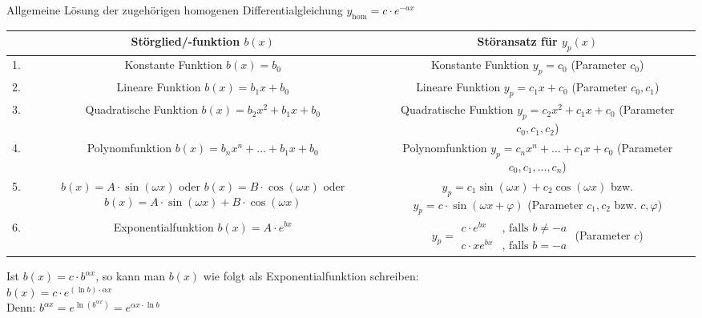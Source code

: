 Allgemeine Lösung der zugehörigen homogenen Differentialgleichung $y_\text{hom}=c\cdot e^{-ax}$


\begin{longtable}{cc|c}
& Störglied/-funktion $b(x)$ & Störansatz für $y_p(x)$\\
\hline
1. & \parbox{5cm}{Konstante Funktion\\$b(x)=b_0$} & \parbox{5cm}{Konstante Funktion\\$y_p=c_0$ (Parameter $c_0$)}\\
2. & \parbox{5cm}{Lineare Funktion\\$b(x)=b_1x+b_0$} & \parbox{5cm}{Lineare Funktion\\$y_p=c_1x+c_0$ (Parameter $c_0,c_1$)}\\
3. & \parbox{5cm}{Quadratische Funktion\\$b(x)=b_2x^2+b_1x+b_0$} & \parbox{5cm}{Quadratische Funktion\\$y_p=c_2x^2+c_1x+c_0$ (Parameter $c_0,c_1,c_2$)}\\
4. & \parbox{5cm}{Polynomfunktion\\$b(x)=b_nx^n+\ldots+b_1x+b_0$} & \parbox{5cm}{Polynomfunktion\\$y_p=c_nx^n+\ldots+c_1x+c_0$ (Parameter $c_0,c_1,\ldots,c_n$)}\\
5. & \parbox{5cm}{$b(x)=A\cdot\sin(\omega x)$\\oder $b(x)=B\cdot\cos(\omega x)$\\oder $b(x)=A\cdot\sin(\omega x)+B\cdot\cos(\omega x)$} & \parbox{5cm}{$y_p=c_1\sin(\omega x)+c_2\cos(\omega x)$\\bzw. $y_p=c\cdot\sin(\omega x +\varphi)$ (Parameter $c_1,c_2$ bzw. $c,\varphi$)}\\
6. & \parbox{5cm}{Exponentialfunktion\\$b(x)=A\cdot e^{bx}$} & \parbox{5cm}{$y_p=\begin{array}{rl}
	c\cdot e^{bx}&\text{, falls }b\ne-a\\
	c\cdot xe^{bx}&\text{, falls }b=-a
	\end{array}$ (Parameter $c$)}\\
\end{longtable}

\Bem Ist $b(x)=c\cdot b^{\alpha x}$, so kann man $b(x)$ wie folgt als Exponentialfunktion schreiben:\\
\hhspace{2cm}$b(x)=c\cdot e^{(\ln b)\cdot\alpha x}$\\
Denn: $b^{\alpha x}=e^{\ln(b^{\alpha x})}=e^{\alpha x\cdot\ln b}$

